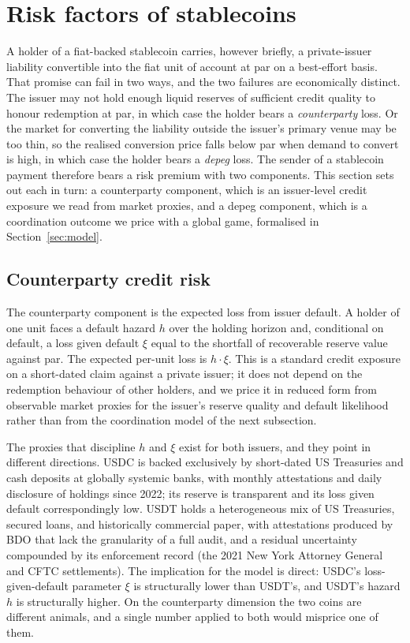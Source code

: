 \section{Risk factors of stablecoins}\label{sec:risk_factors}

A holder of a fiat-backed stablecoin carries, however briefly, a private-issuer liability convertible into the fiat unit of account at par on a best-effort basis. That promise can fail in two ways, and the two failures are economically distinct. The issuer may not hold enough liquid reserves of sufficient credit quality to honour redemption at par, in which case the holder bears a \emph{counterparty} loss. Or the market for converting the liability outside the issuer's primary venue may be too thin, so the realised conversion price falls below par when demand to convert is high, in which case the holder bears a \emph{depeg} loss. The sender of a stablecoin payment therefore bears a risk premium with two components. This section sets out each in turn: a counterparty component, which is an issuer-level credit exposure we read from market proxies, and a depeg component, which is a coordination outcome we price with a global game, formalised in Section~\ref{sec:model}.

\subsection{Counterparty credit risk}\label{sub:counterparty}

The counterparty component is the expected loss from issuer default. A holder of one unit faces a default hazard $h$ over the holding horizon and, conditional on default, a loss given default $\xi$ equal to the shortfall of recoverable reserve value against par. The expected per-unit loss is $h\cdot\xi$. This is a standard credit exposure on a short-dated claim against a private issuer; it does not depend on the redemption behaviour of other holders, and we price it in reduced form from observable market proxies for the issuer's reserve quality and default likelihood rather than from the coordination model of the next subsection.

The proxies that discipline $h$ and $\xi$ exist for both issuers, and they point in different directions. USDC is backed exclusively by short-dated US Treasuries and cash deposits at globally systemic banks, with monthly attestations and daily disclosure of holdings since 2022; its reserve is transparent and its loss given default correspondingly low. USDT holds a heterogeneous mix of US Treasuries, secured loans, and historically commercial paper, with attestations produced by BDO that lack the granularity of a full audit, and a residual uncertainty compounded by its enforcement record (the 2021 New York Attorney General and CFTC settlements). The implication for the model is direct: USDC's loss-given-default parameter $\xi$ is structurally lower than USDT's, and USDT's hazard $h$ is structurally higher. On the counterparty dimension the two coins are different animals, and a single number applied to both would misprice one of them.

